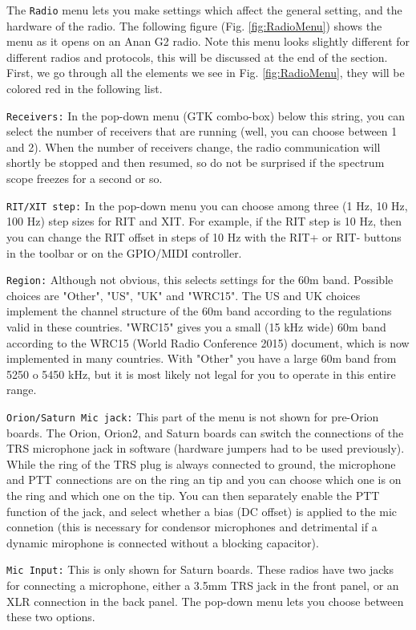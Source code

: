 \documentclass[12pt]{book}
\def\rett#1{\texttt{\color{red}#1}}
\def\bltt#1{\texttt{\color{blue}#1}}
\begin{document}
The \bltt{Radio} menu lets you make settings which affect the general setting, and the hardware of the radio.
The following figure (Fig. \ref{fig:RadioMenu}) shows the menu as it opens on an Anan G2 radio.
Note this menu looks slightly different for different radios and protocols, this will be discussed
at the end of the section. First, we go through all the elements we see in Fig. \ref{fig:RadioMenu},
they will be colored red in the following list.

\rett{Receivers:} In the pop-down menu (GTK combo-box) below this string, you can select the number
of receivers that are running (well, you can choose between 1 and 2). When the number of receivers change,
the radio communication will shortly be stopped and then resumed, so do not be surprised if the spectrum
scope freezes for a second or so.

\rett{RIT/XIT step:} In the pop-down menu you can choose among three (1 Hz, 10 Hz, 100 Hz) step sizes
for RIT and XIT. For example, if the RIT step is 10 Hz, then you can change the RIT offset in steps of
10 Hz with the RIT+ or RIT- buttons in the toolbar or on the GPIO/MIDI controller.

\rett{Region:} Although not obvious, this selects settings for the 60m band. Possible choices are "Other",
"US", "UK" and "WRC15". The US and UK choices implement the channel structure of the 60m band according
to the regulations valid in these countries. "WRC15" gives you a small (15 kHz wide) 60m band according to the WRC15
(World Radio Conference 2015) document, which is now implemented in many countries. With "Other" you
have a large 60m band from 5250 o 5450 kHz, but it is most likely not legal for you to operate in this
entire range.

\rett{Orion/Saturn Mic jack:} This part of the menu is not shown for pre-Orion boards. 
The Orion, Orion2, and Saturn boards can switch the connections
 of the TRS microphone jack in software (hardware jumpers had to be used previously).
While the ring of the TRS plug is always connected to ground, the microphone and PTT connections are on the
ring an tip and you can choose which one is on the ring and which one on the tip. You can then separately
enable the PTT function of the jack, and select whether a bias (DC offset) is applied to the mic connetion
(this is necessary for condensor microphones and detrimental if a dynamic mirophone is connected without
a blocking capacitor).

\rett{Mic Input:} This is only shown for Saturn boards. These radios have two jacks for connecting a microphone,
either a 3.5mm TRS jack in the front panel, or an XLR connection in the back panel. The pop-down menu lets you
choose between these two options.
\end{document}
